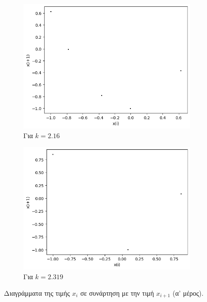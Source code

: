 \begin{figure}[ht]
\begin{subfigure}[b]{0.4\textwidth}
		\includegraphics[width=\textwidth]{LateX images/cheb q=0.9/g6}
		\caption{Για $k=2.16$}
		\label{f:k144}
	\end{subfigure}
	\hfill
	\begin{subfigure}[b]{0.4\textwidth}
		\centering
		\includegraphics[width=\textwidth]{LateX images/cheb q=0.9/g7}
		\caption{Για $k=2.319$}
		\label{f:k145}
	\end{subfigure}
	\hfill

	\caption{Διαγράμματα της τιμής \(x_i\) σε συνάρτηση με την τιμή \(x_{i+1}\) (α' μέρος).}
	\label{f:k250}
\end{figure}
